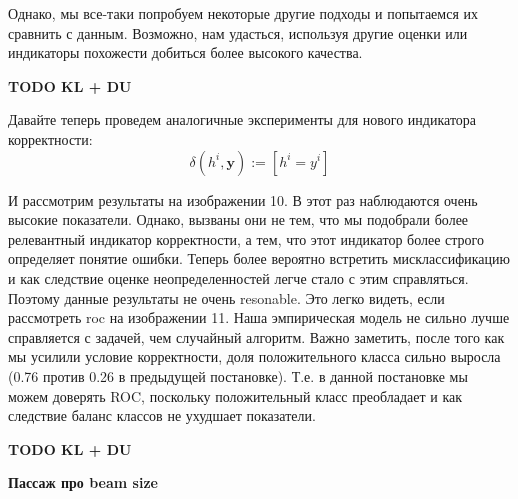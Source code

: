 \documentclass[a4paper,14pt]{extarticle}
\begin{document}
	Однако, мы все-таки попробуем некоторые другие подходы и попытаемся их сравнить с данным. Возможно, нам удасться, используя другие оценки или индикаторы похожести добиться более высокого качества.
	
	\textbf{TODO KL + DU}
	
	Давайте теперь проведем аналогичные эксперименты для нового индикатора корректности:
	\begin{equation}
		\delta(h^i, \textbf{y}) := [h^i = y^i]
	\end{equation}
	
		
	\begin{figure}[t]
	\end{figure}	
	И рассмотрим результаты на изображении 10. В этот раз наблюдаются очень высокие показатели. Однако, вызваны они не тем, что мы подобрали более релевантный индикатор корректности, а тем, что этот индикатор более строго определяет понятие ошибки. Теперь более вероятно встретить мисклассификацию и как следствие оценке неопределенностей легче стало с этим справляться. Поэтому данные результаты не очень resonable. Это легко видеть, если рассмотреть roc на изображении 11. Наша эмпирическая модель не сильно лучше справляется с задачей, чем случайный алгоритм. Важно заметить, после того как мы усилили условие корректности, доля положительного класса сильно выросла (0.76 против 0.26 в предыдущей постановке). Т.е. в данной постановке мы можем доверять ROC, поскольку положительный класс преобладает и как следствие баланс классов не ухудшает показатели.
	
	\textbf{TODO KL + DU}
	
	\textbf{Пассаж про beam size}

	\begin{figure}[t]
	\end{figure}
	
\end{document}
